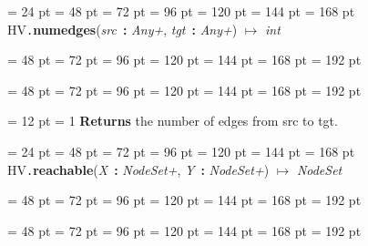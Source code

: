 {{{{{{{\/}\par}
\par}
\par}
\par}
\par}
{\par \noindent  \leftskip = 24 pt  \leftmargini = 48 pt  \leftmarginii = 72 pt  \leftmarginiii = 96 pt  \leftmarginiv = 120 pt  \leftmarginv = 144 pt  \leftmarginvi = 168 pt HV{\tt .\/}{\bf {\large {\bf numedges\/}}\/}({\em src\/}~{\bf :}  {\em Any+\/}, {\em tgt\/}~{\bf :}  {\em Any+\/}) \(\mapsto \)  {\em int\/}{\par \noindent
{\par \noindent  \leftskip = 48 pt  \leftmargini = 72 pt  \leftmarginii = 96 pt  \leftmarginiii = 120 pt  \leftmarginiv = 144 pt  \leftmarginv = 168 pt  \leftmarginvi = 192 pt {\par \noindent
\par}
\par}
{\par \noindent  \leftskip = 48 pt  \leftmargini = 72 pt  \leftmarginii = 96 pt  \leftmarginiii = 120 pt  \leftmarginiv = 144 pt  \leftmarginv = 168 pt  \leftmarginvi = 192 pt {\par \noindent
{\par \pagebreak[3.100000] \noindent \hangindent = 12 pt \hangafter = 1 
{\bf Returns \/} the number of edges from src to tgt.
\par}
\par}
\par}
\par}
\par}
{\par \noindent  \leftskip = 24 pt  \leftmargini = 48 pt  \leftmarginii = 72 pt  \leftmarginiii = 96 pt  \leftmarginiv = 120 pt  \leftmarginv = 144 pt  \leftmarginvi = 168 pt HV{\tt .\/}{\bf {\large {\bf reachable\/}}\/}({\em X\/}~{\bf :}  {\em NodeSet+\/}, {\em Y\/}~{\bf :}  {\em NodeSet+\/}) \(\mapsto \)  {\em NodeSet\/}{\par \noindent
{\par \noindent  \leftskip = 48 pt  \leftmargini = 72 pt  \leftmarginii = 96 pt  \leftmarginiii = 120 pt  \leftmarginiv = 144 pt  \leftmarginv = 168 pt  \leftmarginvi = 192 pt {\par \noindent
\par}
\par}
{\par \noindent  \leftskip = 48 pt  \leftmargini = 72 pt  \leftmarginii = 96 pt  \leftmarginiii = 120 pt  \leftmarginiv = 144 pt  \leftmarginv = 168 pt  \leftmarginvi = 192 pt {\par \noindent
}}}}}
